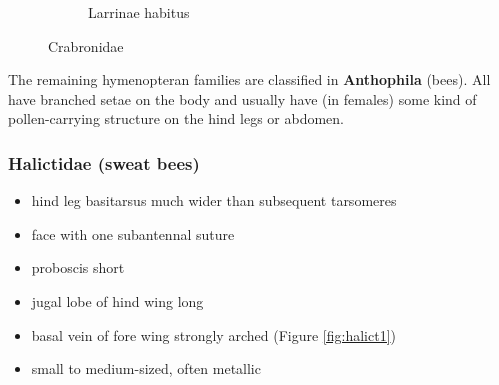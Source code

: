 \documentclass[letterpaper, 11pt]{article}
\begin{document}
\begin{figure}[ht!]
\begin{subfigure}[ht!]{0.4\textwidth}
        \caption{Larrinae habitus \citep[][Fig. 102]{goulet1993hymenoptera}}
        \label{fig:crabronid2}
    \end{subfigure}
    \caption{Crabronidae}\label{fig:crabronids}
\end{figure}
\FloatBarrier

\noindent{}The remaining hymenopteran families are classified in \textbf{Anthophila} (bees). All have branched setae on the body and usually have (in females) some kind of pollen-carrying structure on the hind legs or abdomen.

\subsubsection{Halictidae (sweat bees)}
\begin{itemize}
\item hind leg basitarsus much wider than subsequent tarsomeres 
\item face with one subantennal suture
\item proboscis short
\item jugal lobe of hind wing long
\item basal vein of fore wing strongly arched (Figure \ref{fig:halict1})
\item small to medium-sized, often metallic
\end{itemize}
\end{document}
